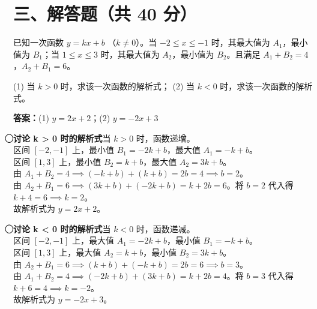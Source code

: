 \documentclass{exam-zh}
\newcommand{\answerarea}[1][40mm]{%
  \vspace{2mm}%
  \begin{tcolorbox}[
    enhanced, breakable,
    colback=white,
    colframe=white,
    boxrule=0pt,
    height=#1,
    valign=top,
    bottom=0mm,
    after skip=0mm,
  ]
  \end{tcolorbox}%
}
\newcounter{solstep}
\newcommand{\solstep}[2]{%
  \stepcounter{solstep}%
  \par\medskip
  \noindent\hangindent=6mm
  {\color{edu-blue}\bfseries\textcircled{\scriptsize\thesolstep}\enspace #1}\enspace #2\par
}
\begin{document}
\section*{三、解答题（共 40 分）}


\begin{problem}[points=20]
  已知一次函数 $y = kx + b$ （$k \neq 0$）。当 $-2 \leq x \leq -1$ 时，其最大值为 $A_1$，最小值为 $B_1$；当 $1 \leq x \leq 3$ 时，其最大值为 $A_2$，最小值为 $B_2$。且满足 $A_1 + B_2 = 4$，$A_2 + B_1 = 6$。

(1) 当 $k > 0$ 时，求该一次函数的解析式；
(2) 当 $k < 0$ 时，求该一次函数的解析式。
  \answerarea[60mm]
  \setcounter{solstep}{0}
  \begin{solutionblock}
    \textbf{答案：}(1) $y = 2x + 2$；(2) $y = -2x + 3$\par\medskip
    \solstep{讨论 k > 0 时的解析式}{当 $k > 0$ 时，函数递增。\\ 区间 $[-2, -1]$ 上，最小值 $B_1 = -2k + b$，最大值 $A_1 = -k + b$。\\ 区间 $[1, 3]$ 上，最小值 $B_2 = k + b$，最大值 $A_2 = 3k + b$。\\ 由 $A_1 + B_2 = 4 \implies (-k+b) + (k+b) = 2b = 4 \implies b = 2$。\\ 由 $A_2 + B_1 = 6 \implies (3k+b) + (-2k+b) = k + 2b = 6$。将 $b=2$ 代入得 $k + 4 = 6 \implies k = 2$。\\ 故解析式为 $y = 2x + 2$。}
    \solstep{讨论 k < 0 时的解析式}{当 $k < 0$ 时，函数递减。\\ 区间 $[-2, -1]$ 上，最大值 $A_1 = -2k + b$，最小值 $B_1 = -k + b$。\\ 区间 $[1, 3]$ 上，最大值 $A_2 = k + b$，最小值 $B_2 = 3k + b$。\\ 由 $A_2 + B_1 = 6 \implies (k+b) + (-k+b) = 2b = 6 \implies b = 3$。\\ 由 $A_1 + B_2 = 4 \implies (-2k+b) + (3k+b) = k + 2b = 4$。将 $b=3$ 代入得 $k + 6 = 4 \implies k = -2$。\\ 故解析式为 $y = -2x + 3$。}
  \end{solutionblock}
\end{problem}


\end{document}
